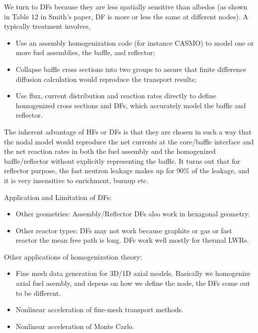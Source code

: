 \documentclass{school-22.211-notes}
\begin{document}
We turn to DFs because they are less spatially sensitive than albedos (as shown in Table 12 in Smith's paper, DF is more or less the same at different nodes). A typically treatment involves, 
\begin{itemize}
\item Use an assembly homogenization code (for instance CASMO) to model one or more fuel assemblies, the baffle, and reflector; 
\item Collapse baffle cross sections into two groups to assure that finite difference diffusion calculation would reproduce the transport results;  
\item Use flux, current distribution and reaction rates directly to define homogenized cross sections and DFs, which accurately model the baffle and reflector. 
\end{itemize}
The inherent advantage of HFs or DFs is that they are chosen in such a way that the nodal model would reproduce the net currents at the core/baffle interface and the net reaction rates in both the fuel assembly and the homogenized baffle/reflector without explicitly representing the baffle. It turns out that for reflector purpose, the fast neutron leakage makes up for 90\% of the leakage, and it is very insensitive to enrichment, burnup etc. 

Application and Limitation of DFs:
\begin{itemize}
\item Other geometries: Assembly/Reflector DFs also work in hexagonal geometry. 
\item Other reactor types: DFs may not work because graphite or gas or fast reactor the mean free path is long. DFs work well mostly for thermal LWRs. 
\end{itemize}

Other applications of homogenization theory: 
\begin{itemize}
\item Fine mesh data generation for 3D/1D axial models. Basically we homogenize axial fuel asembly, and depens on how we define the node, the DFs come out to be different. 
\item Nonlinear acceleration of fine-mesh transport methods. 
\item Nonlinear acceleration of Monte Carlo. 
\end{itemize}
\end{document}
